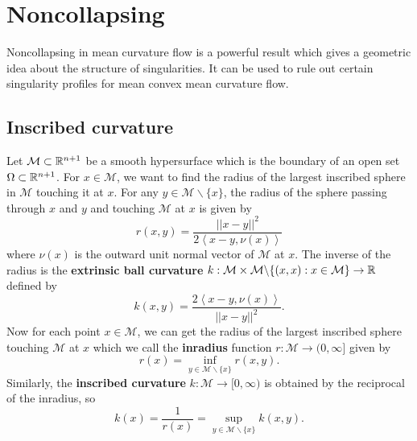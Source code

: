 \chapter{Noncollapsing}

Noncollapsing in mean curvature flow is a powerful result which gives a geometric idea about the structure of singularities. It can be used to rule out certain singularity profiles for mean convex mean curvature flow. 

\section{Inscribed curvature}

Let $ \mathcal{M} \subset \mathbb{R}^{n+1} $ be a smooth hypersurface which is the boundary of an open set $ \Omega \subset \mathbb{R}^{n+1} $. For $ x \in \mathcal{M} $, we want to find the radius of the largest inscribed sphere in $ \mathcal{M} $ touching it at $ x $. For any $ y \in \mathcal{M}\backslash \{x\} $, the radius of the sphere passing through $ x $ and $ y $ and touching $ \mathcal{M} $ at $ x $ is given by \begin{equation}
    r(x,y) = \frac{||x-y||^{2}}{2\left< x-y,\nu(x) \right>}
\end{equation}
where $ \nu(x) $ is the outward unit normal vector of $ \mathcal{M} $ at $ x $. The inverse of the radius is the \textbf{extrinsic ball curvature} $ k : \mathcal{M} \times \mathcal{M} \backslash \{(x,x) : x \in \mathcal{M}\} \to \mathbb{R} $ defined by \begin{equation}
    k(x,y) = \frac{2 \left< x-y,\nu(x) \right>}{||x-y||^{2}}.
\end{equation} 
Now for each point $ x \in \mathcal{M} $, we can get the radius of the largest inscribed sphere touching $ \mathcal{M} $ at $ x $  which we call the \textbf{inradius} function $r :  \mathcal{M}  \to (0,\infty]$ given by %
\begin{equation}
    r(x) = \inf_{{y \in \mathcal{M}\backslash \{x\}}} r(x,y).
\end{equation}
Similarly, the \textbf{inscribed curvature} $ k : \mathcal{M} \to [0, \infty) $  is obtained by the reciprocal of the inradius, so \begin{equation}
    k(x) = \frac{1}{r(x)} = \sup_{y \in \mathcal{M}\backslash \{x\}} k(x,y).%
\end{equation}

